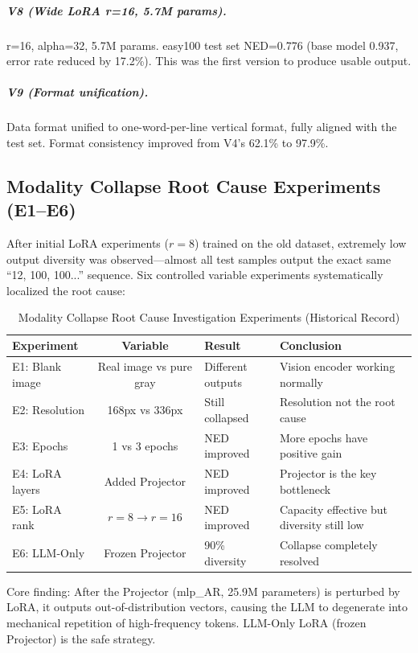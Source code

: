 \subparagraph{V8 (Wide LoRA r=16, 5.7M params).}
r=16, alpha=32, 5.7M params. easy100 test set NED=0.776 (base model 0.937, error rate reduced by 17.2\%). This was the first version to produce usable output.

\subparagraph{V9 (Format unification).}
Data format unified to one-word-per-line vertical format, fully aligned with the test set. Format consistency improved from V4's 62.1\% to 97.9\%.

\subsection{Modality Collapse Root Cause Experiments (E1--E6)}

After initial LoRA experiments ($r=8$) trained on the old dataset, extremely low output diversity was observed---almost all test samples output the exact same ``12, 100, 100...'' sequence. Six controlled variable experiments systematically localized the root cause:

\begin{table}[h]
\centering
\caption{Modality Collapse Root Cause Investigation Experiments (Historical Record)}
\begin{tabular}{lcp{2.5cm}p{3.5cm}}
\toprule
\textbf{Experiment} & \textbf{Variable} & \textbf{Result} & \textbf{Conclusion} \\
\midrule
E1: Blank image & Real image vs pure gray & Different outputs & Vision encoder working normally \\
E2: Resolution & 168px vs 336px & Still collapsed & Resolution not the root cause \\
E3: Epochs & 1 vs 3 epochs & NED improved & More epochs have positive gain \\
E4: LoRA layers & Added Projector & NED improved & Projector is the key bottleneck \\
E5: LoRA rank & $r=8 \to r=16$ & NED improved & Capacity effective but diversity still low \\
E6: LLM-Only & Frozen Projector & 90\% diversity & Collapse completely resolved \\
\bottomrule
\end{tabular}
\end{table}

Core finding: After the Projector (mlp\_AR, 25.9M parameters) is perturbed by LoRA, it outputs out-of-distribution vectors, causing the LLM to degenerate into mechanical repetition of high-frequency tokens. LLM-Only LoRA (frozen Projector) is the safe strategy.


